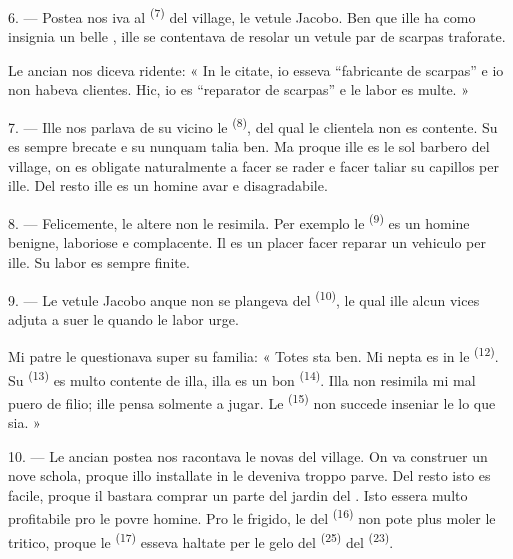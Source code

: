 6. --- Postea nos iva al  \textsuperscript{(7)} del village, le
vetule Jacobo. Ben que ille ha como insignia un belle , ille se
contentava de resolar un vetule par de scarpas traforate.

Le ancian nos diceva ridente: « In le citate, io esseva “fabricante de
scarpas” e io non habeva clientes. Hic, io es “reparator de scarpas” e le labor
es multe. »

7. --- Ille nos parlava de su vicino le  \textsuperscript{(8)},
del qual le clientela non es contente. Su  es sempre brecate e
su  nunquam talia ben. Ma proque ille es le sol barbero del
village, on es obligate naturalmente a facer se rader e facer taliar su capillos
per ille. Del resto ille es un homine avar e disagradabile.

8. --- Felicemente, le altere  non le resimila. Per exemplo le
 \textsuperscript{(9)} es un homine benigne, laboriose e
complacente. Il es un placer facer reparar un vehiculo per ille. Su labor es
sempre finite.

9. --- Le vetule Jacobo anque non se plangeva del 
\textsuperscript{(10)}, le qual ille alcun vices adjuta a suer le
 quando le labor urge.

Mi patre le questionava super su familia: « Totes sta ben. Mi nepta es in le
 \textsuperscript{(12)}. Su 
\textsuperscript{(13)} es multo contente de illa, illa es un bon 
\textsuperscript{(14)}. Illa non resimila mi mal puero de filio; ille pensa
solmente a jugar. Le  \textsuperscript{(15)} non succede
inseniar le lo que sia. »

\VUsaut{3.0mm}
\VUsaut{3.0mm}

10. --- Le ancian postea nos racontava le novas del village. On va construer un
nove schola, proque illo installate in le  deveniva troppo
parve. Del resto isto es facile, proque il bastara comprar un parte del jardin
del . Isto essera multo profitabile pro le povre homine. Pro le
frigido, le  del  \textsuperscript{(16)} non pote
plus moler le tritico, proque le  \textsuperscript{(17)} esseva
haltate per le gelo del  \textsuperscript{(25)} del
 \textsuperscript{(23)}.

